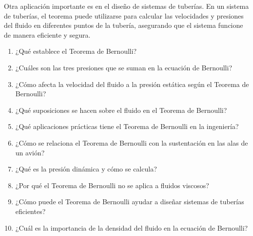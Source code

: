 \documentclass[../main]{subfiles}
\begin{document}
Otra aplicación importante es en el diseño de sistemas de tuberías. En un sistema de tuberías, el teorema puede utilizarse para calcular las velocidades y presiones del fluido en diferentes puntos de la tubería, asegurando que el sistema funcione de manera eficiente y segura.

\begin{enumerate}
    \item ¿Qué establece el Teorema de Bernoulli?
    \item ¿Cuáles son las tres presiones que se suman en la ecuación de Bernoulli?
    \item ¿Cómo afecta la velocidad del fluido a la presión estática según el Teorema de Bernoulli?
    \item ¿Qué suposiciones se hacen sobre el fluido en el Teorema de Bernoulli?
    \item ¿Qué aplicaciones prácticas tiene el Teorema de Bernoulli en la ingeniería?
    \item ¿Cómo se relaciona el Teorema de Bernoulli con la sustentación en las alas de un avión?
    \item ¿Qué es la presión dinámica y cómo se calcula?
    \item ¿Por qué el Teorema de Bernoulli no se aplica a fluidos viscosos?
    \item ¿Cómo puede el Teorema de Bernoulli ayudar a diseñar sistemas de tuberías eficientes?
    \item ¿Cuál es la importancia de la densidad del fluido en la ecuación de Bernoulli?
\end{enumerate}
\end{document}
